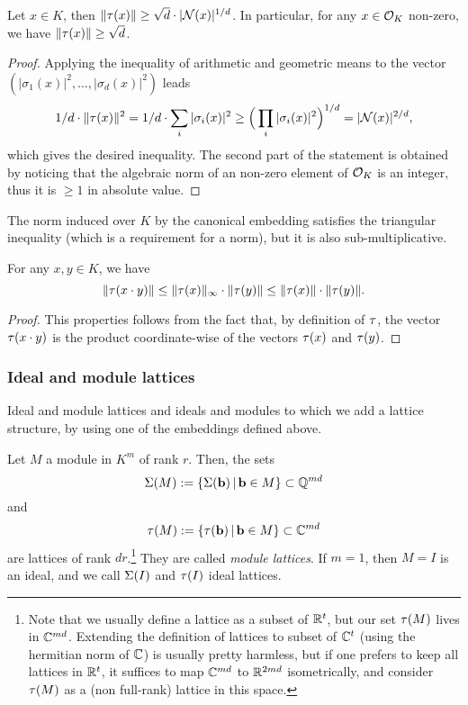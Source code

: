 \begin{lemma}
\label{lemma:AM-GM-inequality}
Let $x \in K$, then $\|\tau(x)\| \geq \sqrt{d} \cdot |\mathcal{N}(x)|^{1/d}$. In particular, for any $x \in \mathcal{O}_K$ non-zero, we have $\|\tau(x)\| \geq \sqrt{d}$.
\end{lemma}

\begin{proof}
Applying the inequality of arithmetic and geometric means to the vector $(|\sigma_1(x)|^2, \dots, |\sigma_d(x)|^2)$ leads
\[ 1/d \cdot \|\tau(x)\|^2 = 1/d \cdot \sum_i |\sigma_i(x)|^2 \geq \Big(\prod_i |\sigma_i(x)|^2\Big)^{1/d} = |\mathcal{N}(x)|^{2/d},\]
which gives the desired inequality. The second part of the statement is obtained by noticing that the algebraic norm of an non-zero element of $\mathcal{O}_K$ is an integer, thus it is $\geq 1$ in absolute value.
\end{proof}

The norm induced over $K$ by the canonical embedding satisfies the triangular inequality (which is a requirement for a norm), but it is also sub-multiplicative.

\begin{lemma}
For any $x,y \in K$, we have
\[\|\tau(x \cdot y)\| \leq \|\tau(x)\|_\infty \cdot \|\tau(y)\| \leq \|\tau(x)\| \cdot \|\tau(y)\|.\]
\end{lemma}

\begin{proof}
This properties follows from the fact that, by definition of $\tau$, the vector $\tau(x \cdot y)$ is the product coordinate-wise of the vectors $\tau(x)$ and $\tau(y)$.
\end{proof}

\subsubsection{Ideal and module lattices}
\label{sec:id-mod-lat}
Ideal and module lattices and ideals and modules to which we add a lattice structure, by using one of the embeddings defined above.

\begin{proposition}
Let $M$ a module in $K^m$ of rank $r$. Then, the sets 
\[\Sigma(M) := \{ \Sigma(\mathbf b)\,|\, \mathbf b\in M\} \subset \mathbb{Q}^{md}\]
and 
\[\tau(M) := \{ \tau(\mathbf b)\,|\, \mathbf b\in M\} \subset \mathbb{C}^{md}\]
are lattices of rank $dr$.\footnote{Note that we usually define a lattice as a subset of $\mathbb{R}^t$, but our set $\tau(M)$ lives in $\mathbb{C}^{md}$. Extending the definition of lattices to subset of $\mathbb{C}^t$ (using the hermitian norm of $\mathbb{C}$) is usually pretty harmless, but if one prefers to keep all lattices in $\mathbb{R}^t$, it suffices to map $\mathbb{C}^{md}$ to $\mathbb{R}^{2md}$ isometrically, and consider $\tau(M)$ as a (non full-rank) lattice in this space.}
They are called \textit{module lattices}. If $m = 1$, then $M = I$ is an ideal, and we call $\Sigma(I)$ and $\tau(I)$ ideal lattices.
\end{proposition}

